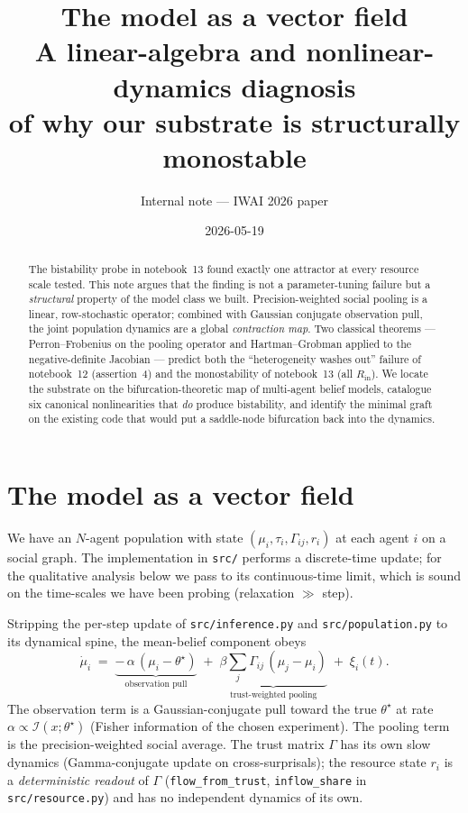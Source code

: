 \documentclass[11pt,a4paper]{article}
\title{The model as a vector field\\[2pt]
\large A linear-algebra and nonlinear-dynamics diagnosis\\
of why our substrate is structurally monostable}
\author{Internal note --- IWAI 2026 paper}
\date{2026-05-19}
\theoremstyle{plain}
\begin{document}
\maketitle

\begin{abstract}
The bistability probe in notebook~13 found exactly one attractor at every
resource scale tested. This note argues that the finding is not a
parameter-tuning failure but a \emph{structural} property of the model
class we built. Precision-weighted social pooling is a linear,
row-stochastic operator; combined with Gaussian conjugate observation
pull, the joint population dynamics are a global \emph{contraction map}.
Two classical theorems --- Perron--Frobenius on the pooling operator
and Hartman--Grobman applied to the negative-definite Jacobian ---
predict both the ``heterogeneity washes out'' failure of notebook~12
(assertion~4) and the monostability of notebook~13 (all $R_{\text{in}}$).
We locate the substrate on the bifurcation-theoretic map of multi-agent
belief models, catalogue six canonical nonlinearities that
\emph{do} produce bistability, and identify the minimal graft on the
existing code that would put a saddle-node bifurcation back into the
dynamics.
\end{abstract}

\section{The model as a vector field}
\label{sec:vector-field}

We have an $N$-agent population with state $(\mu_i, \tau_i, \Gamma_{ij},
r_i)$ at each agent $i$ on a social graph. The implementation in
\texttt{src/} performs a discrete-time update; for the qualitative
analysis below we pass to its continuous-time limit, which is sound on
the time-scales we have been probing (relaxation $\gg$ step).

Stripping the per-step update of \texttt{src/inference.py} and
\texttt{src/population.py} to its dynamical spine, the mean-belief
component obeys
\begin{equation}
\dot{\mu}_i \;=\;
\underbrace{-\,\alpha\,(\mu_i - \theta^\star)}_{\text{observation pull}}
\;+\;
\underbrace{\beta \sum_{j} \Gamma_{ij}\,(\mu_j - \mu_i)}_{\text{trust-weighted pooling}}
\;+\; \xi_i(t).
\label{eq:mu-dot}
\end{equation}
The observation term is a Gaussian-conjugate pull toward the true
$\theta^\star$ at rate $\alpha \propto \mathcal{I}(x;\theta^\star)$ (Fisher
information of the chosen experiment). The pooling term is the
precision-weighted social average. The trust matrix $\Gamma$ has its
own slow dynamics (Gamma-conjugate update on cross-surprisals); the
resource state $r_i$ is a \emph{deterministic readout} of $\Gamma$
(\texttt{flow\_from\_trust}, \texttt{inflow\_share} in
\texttt{src/resource.py}) and has no independent dynamics of its own.
\end{document}
